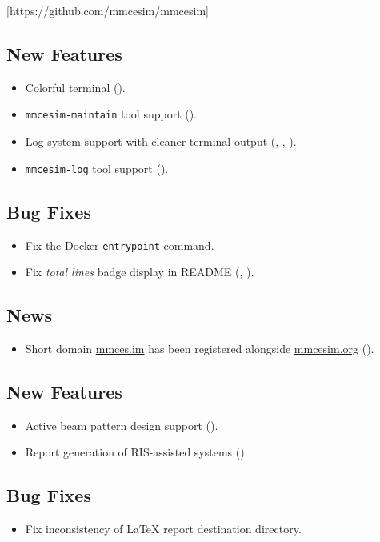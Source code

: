 [https://github.com/mmcesim/mmcesim]
\subsection*{New Features}
\begin{itemize}
  \item Colorful terminal ().
  \item \texttt{mmcesim-maintain} tool support ().
  \item Log system support with cleaner terminal output (, , ).
  \item \texttt{mmcesim-log} tool support ().
\end{itemize}
\subsection*{Bug Fixes}
\begin{itemize}
  \item Fix the Docker \texttt{entrypoint} command.
  \item Fix \textit{total lines} badge display in README (, ).
\end{itemize}
\subsection*{News}
\begin{itemize}
  \item Short domain \href{https://mmces.im}{mmces.im} has been registered alongside \href{https://mmcesim.org}{mmcesim.org} ().
\end{itemize}

\subsection*{New Features}
\begin{itemize}
  \item Active beam pattern design support ().
  \item Report generation of RIS-assisted systems ().
\end{itemize}
\subsection*{Bug Fixes}
\begin{itemize}
  \item Fix inconsistency of \LaTeX{} report destination directory.
\end{itemize}

